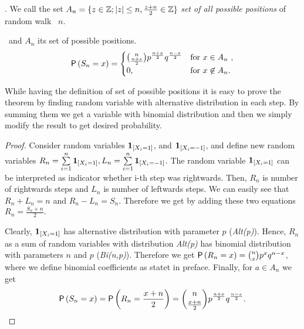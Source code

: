 \begin{defn}\label{defn-set_all_possible_values}
 \Lrw. We call the set $A_n=\{z \in \mathbb{Z}; \left|{z}\right|\leq n, \frac{z+n}{2}\in \mathbb{Z} \}$ \emph{set of all possible positions} of random walk \rw\ \intime $n$.
\end{defn}


\begin{thm}\label{thm-probability_position_time}
 \Lrw\ and $A_n$ its set of possible positions.
 \[
 \operatorname{\mathsf{P}} \left( S_n=x \right) =
 \begin{cases}
 \binom{n}{\frac{n+x}{2}}p^{\frac{n+x}{2}}q^{\frac{n-x}{2}} & \text{for $x \in A_n$ },\\
 0, & \text{for $x \not\in A_n$}.
 \end{cases}
 \]

\end{thm}

\begin{rem}
  While having the definition of set of possible positions it is easy to prove the theorem by finding random variable with alternative distribution in each step. By summing them we get a variable with binomial distribution and then we simply modify the result to get desired probability.
\end{rem}

\begin{proof}
  Consider random variables $\mathbf{1}_{[X_i=1]}$, and
   $\mathbf{1}_{[X_i=-1]}$, and define new random variables
   $R_n=\suma \indikator{X_i=1}, L_n=\suma \indikator{X_i=-1}$.  The
   random variable $\mathbf{1}_{[X_i=1]}$ can be interpreted as indicator
   whether i-th step was rightwards. Then, $R_n$ is number of
   rightwards steps and $L_n$ is number of leftwards steps. We can
   easily see that $R_n+L_n=n$ and $R_n-L_n=S_n$.  Therefore we get by
   adding these two equations $R_n=\frac{S_n+n}{2}.$

   Clearly, $\mathbf{1}_{[X_i=1]}$ has alternative distribution with
   parameter $p$ (\textit{Alt(p)}). Hence, $R_n$ as a sum of \iid
   random variables with distribution \textit{Alt(p)} has binomial
   distribution with parameters $n$ and $p$ (\textit{Bi(n,p)}).
   Therefore we get
   $\operatorname{\mathsf{P}} \left(R_n=x \right) =\binom{n}{x}p^{x}q^{n-x}$, where we define
  binomial coefficients as statet in preface.
   Finally, for $a \in A_n$ we get
   \[
     \operatorname{\mathsf{P}} \left( S_n=x \right) =\operatorname{\mathsf{P}}\left( R_n=\frac{x+n}{2} \right) =
     \binom{n}{\frac{x+n}{2}}p^{\frac{n+x}{2}}q^{\frac{n-x}{2}}.
   \]
\end{proof}


